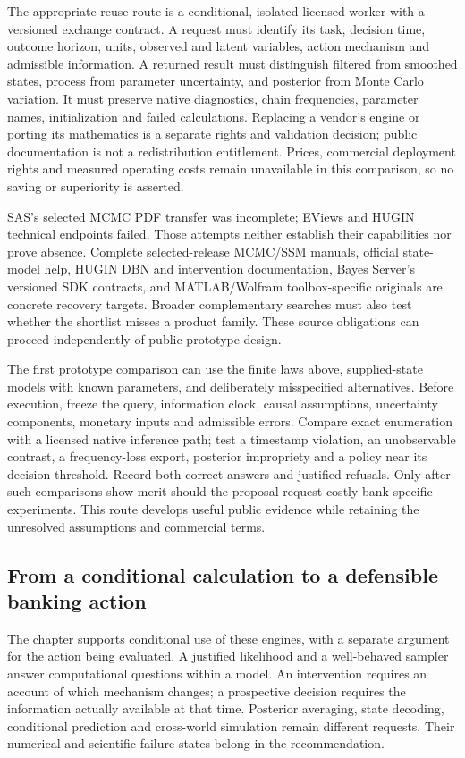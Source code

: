 The appropriate reuse route is a conditional, isolated licensed worker with a
versioned exchange contract. A request must identify its task, decision time,
outcome horizon, units, observed and latent variables, action mechanism and
admissible information. A returned result must distinguish filtered from
smoothed states, process from parameter uncertainty, and posterior from Monte
Carlo variation. It must preserve native diagnostics, chain frequencies,
parameter names, initialization and failed calculations. Replacing a vendor's
engine or porting its mathematics is a separate rights and validation decision;
public documentation is not a redistribution entitlement. Prices, commercial
deployment rights and measured operating costs remain unavailable in this
comparison, so no saving or superiority is asserted.

SAS's selected MCMC PDF transfer was incomplete; EViews and HUGIN technical
endpoints failed. Those attempts neither establish their capabilities nor
prove absence. Complete selected-release MCMC/SSM manuals, official state-model
help, HUGIN DBN and intervention documentation, Bayes Server's versioned SDK
contracts, and MATLAB/Wolfram toolbox-specific originals are concrete recovery
targets. Broader complementary searches must also test whether the shortlist
misses a product family. These source obligations can proceed independently of
public prototype design.

The first prototype comparison can use the finite laws above, supplied-state
models with known parameters, and deliberately misspecified alternatives.
Before execution, freeze the query, information clock, causal assumptions,
uncertainty components, monetary inputs and admissible errors. Compare exact
enumeration with a licensed native inference path; test a timestamp violation,
an unobservable contrast, a frequency-loss export, posterior impropriety and a
policy near its decision threshold. Record both correct answers and justified
refusals. Only after such comparisons show merit should the proposal request
costly bank-specific experiments. This route develops useful public evidence
while retaining the unresolved assumptions and commercial terms.


\subsection{From a conditional calculation to a defensible banking action}

The chapter supports conditional use of these engines, with a separate argument
for the action being evaluated. A justified likelihood and a well-behaved
sampler answer computational questions within a model. An intervention requires
an account of which mechanism changes; a prospective decision requires the
information actually available at that time. Posterior averaging, state decoding,
conditional prediction and cross-world simulation remain different requests.
Their numerical and scientific failure states belong in the recommendation.


